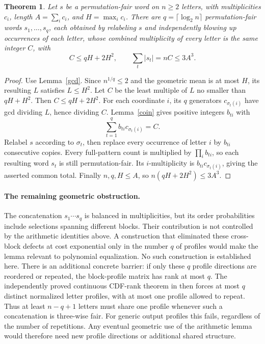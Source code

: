 \documentclass[11pt]{article}
\newtheorem{theorem}{Theorem}
\begin{document}
\begin{theorem}\label{balance}
Let $s$ be a permutation-fair word on $n\ge2$ letters, with
multiplicities $c_i$, length $A=\sum_i c_i$, and $H=\max_i c_i$.
There are $q=\lceil\log_2 n\rceil$ permutation-fair words
$s_1,\ldots,s_q$, each obtained by relabeling $s$ and independently
blowing up occurrences of each letter, whose combined multiplicity
of every letter is the same integer $C$, with
\[
 C\le qH+2H^2,
 \qquad \sum_t|s_t|=nC\le3A^3.
\]
\end{theorem}
\begin{proof}
Use Lemma~\ref{gcd}. Since $n^{1/q}\le2$ and the geometric mean is
at most $H$, its resulting $L$ satisfies $L\le H^2$.
Let $C$ be the least multiple of $L$ no smaller than $qH+H^2$.
Then $C\le qH+2H^2$.
For each coordinate $i$, its $q$ generators $c_{\sigma_t(i)}$
have gcd dividing $L$, hence dividing $C$. Lemma~\ref{coin} gives
positive integers $b_{ti}$ with
\[
 \sum_{t=1}^q b_{ti}c_{\sigma_t(i)}=C.
\]
Relabel $s$ according to $\sigma_t$, then replace every occurrence
of letter $i$ by $b_{ti}$ consecutive copies. Every full-pattern
count is multiplied by $\prod_i b_{ti}$, so each resulting word
$s_t$ is still permutation-fair. Its $i$-multiplicity is
$b_{ti}c_{\sigma_t(i)}$, giving the asserted common total.
Finally $n,q,H\le A$, so $n(qH+2H^2)\le3A^3$.
\end{proof}

\paragraph{The remaining geometric obstruction.}
The concatenation $s_1\cdots s_q$ is balanced in multiplicities,
but its order probabilities include selections spanning different
blocks. Their contribution is not controlled by the arithmetic
identities above. A construction that eliminated these cross-block
defects at cost exponential only in the number $q$ of profiles would
make the lemma relevant to polynomial equalization. No such
construction is established here. There is an additional concrete
barrier: if only these $q$ profile directions are reordered or repeated,
the block-profile matrix has rank at most $q$. The independently proved
continuous CDF-rank theorem in
 then
forces at most $q$ distinct normalized letter profiles, with at most
one profile allowed to repeat. Thus at least $n-q+1$ letters must
share one profile whenever such a concatenation is three-wise fair.
For generic output profiles this fails, regardless of the number of
repetitions. Any eventual geometric use of the arithmetic lemma would
therefore need new profile directions or additional shared structure.
\end{document}
